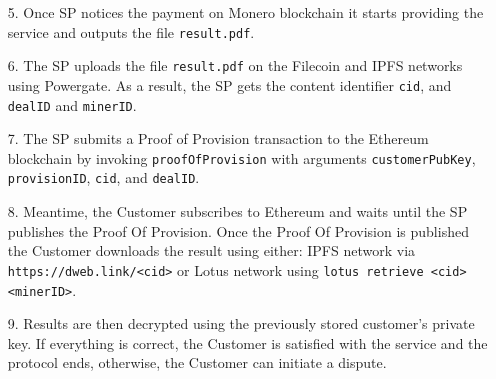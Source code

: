 \begin{enumerate}
  \item[5.] Once SP notices the payment on Monero blockchain it starts providing the service and outputs the file \texttt{result.pdf}.

  \item[6.] The SP uploads the file \texttt{result.pdf} on the Filecoin and IPFS networks using Powergate. As a result, the SP gets the content identifier \texttt{cid}, and \texttt{dealID} and \texttt{minerID}.

  \item[7.] The SP submits a Proof of Provision transaction to the Ethereum blockchain by invoking \texttt{proofOfProvision} with arguments \texttt{customer\-PubKey}, \texttt{provisionID}, \texttt{cid}, and \texttt{dealID}.

  \item[8.] Meantime, the Customer subscribes to Ethereum and waits until the SP publishes the Proof Of Provision.
 Once the Proof Of Provision is published the Customer downloads the result using either: IPFS network via \texttt{https://dweb.link/<cid>} or Lotus network using \texttt{lotus retrieve <cid> <minerID>}. 
 
  \item[9.] Results are then decrypted using the previously stored customer's private key. If everything is correct, the Customer is satisfied with the service and the protocol ends, otherwise, the Customer can initiate a dispute.

\end{enumerate}


